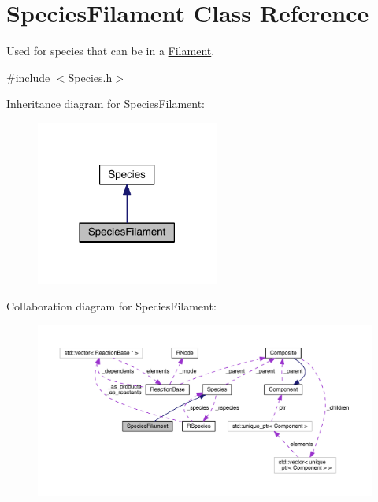 \hypertarget{classSpeciesFilament}{\section{Species\+Filament Class Reference}
\label{classSpeciesFilament}
}


Used for species that can be in a \hyperlink{classFilament}{Filament}.  




{\ttfamily \#include $<$Species.\+h$>$}



Inheritance diagram for Species\+Filament\+:\nopagebreak
\begin{figure}[H]
\begin{center}
\leavevmode
\includegraphics[width=170pt]{classSpeciesFilament__inherit__graph}
\end{center}
\end{figure}


Collaboration diagram for Species\+Filament\+:
\nopagebreak
\begin{figure}[H]
\begin{center}
\leavevmode
\includegraphics[width=350pt]{classSpeciesFilament__coll__graph}
\end{center}
\end{figure}
